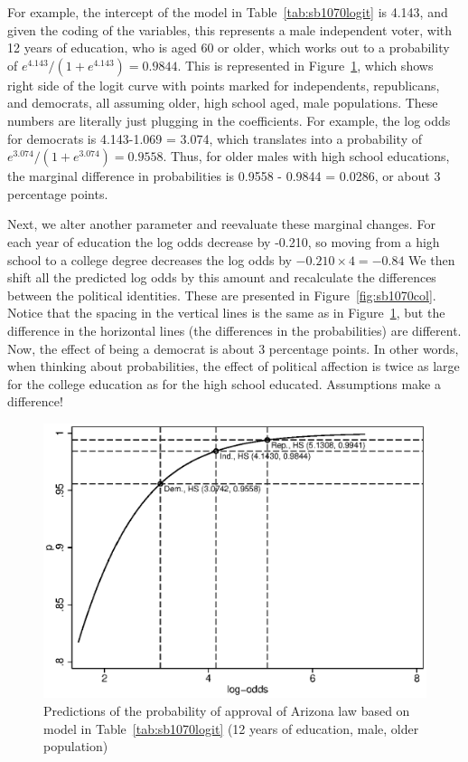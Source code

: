 For example, the intercept of the model in Table~\ref{tab:sb1070logit} is 4.143, and given the coding of the variables, this represents a male independent voter, with 12 years of education, who is aged 60 or older, which works out to a probability of $e^{4.143}/\left(1+e^{4.143}\right) = 0.9844$. This is represented in Figure~\ref{fig:sb1070hs}, which shows right side of the logit curve with points marked for independents, republicans, and democrats, all assuming older, high school aged, male populations. These numbers are literally just plugging in the coefficients. For example, the log odds for democrats is 4.143-1.069 = 3.074, which translates into a probability of $e^{3.074}/\left(1+e^{3.074}\right) = 0.9558$. Thus, for older males with high school educations, the marginal difference in probabilities is 0.9558 - 0.9844 = 0.0286, or about 3 percentage points.

Next, we alter another parameter and reevaluate these marginal changes. For each year of education the log odds decrease by -0.210, so moving from a high school to a college degree decreases the log odds by $-0.210\times4 = -0.84$ We then shift all the predicted log odds by this amount and recalculate the differences between the political identities. These are presented in Figure~\ref{fig:sb1070col}. Notice that the spacing in the vertical lines is the same as in Figure~\ref{fig:sb1070hs}, but the difference in the horizontal lines (the differences in the probabilities) are different. Now, the effect of being a democrat is about 3 percentage points. In other words, when thinking about probabilities, the effect of political affection is twice as large for the college education as for the high school educated. Assumptions make a difference!


\begin{figure}
   \centering
   \includegraphics[angle=0,
           width=.75\textwidth]{sb1070hs.eps}
   \caption{Predictions of the probability of approval of Arizona law based on model in Table~\ref{tab:sb1070logit} (12 years of education, male, older population)}
  \label{fig:sb1070hs}
\end{figure}


